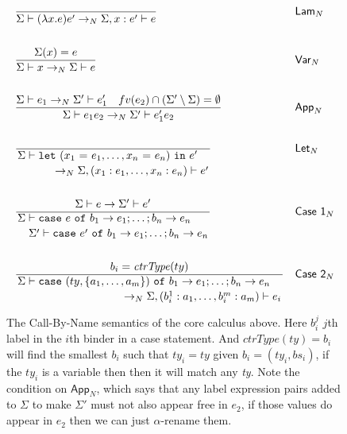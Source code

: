 \documentclass[float=false, crop=false]{standalone}
\numberwithin{subcase}{case}
\newcommand{\tcbn}{\rightarrow_N}
\begin{document}
\begin{figure}
\begin{align*}
  &\frac{}{\Sigma \vdash (\lambda x.e)e' \tcbn \Sigma,x:e' \vdash e } && \mathsf{Lam}_N \\ \\
  &\frac{\Sigma(x) = e}{\Sigma \vdash x \tcbn \Sigma \vdash e} && \mathsf{Var}_N\\ \\
  &\frac{\Sigma \vdash   e_1\tcbn \Sigma' \vdash e_1' \quad fv(e_2) \cap 
    (\Sigma' \setminus \Sigma) = \emptyset
  }{\Sigma \vdash e_1 e_2 \tcbn 
    \Sigma' \vdash e_1' e_2} && \mathsf{App}_N  \\ \\
  &\dfrac{}{\splitdfrac{\Sigma \vdash 
\mathtt{let}\ (x_1\ \mathtt{=}\ e_1,\dotsc, x_n\ \mathtt{=}\ e_n)\ \mathtt{in}\ e'}
    {\tcbn \Sigma,(x_1:e_1,\dotsc,x_n:e_n) \vdash e'}} && \mathsf{Let}_N  \\ \\
  &\dfrac{\Sigma \vdash e \rightarrow \Sigma' \vdash e'}{\splitdfrac{\Sigma \vdash 
  \mathtt{case}\ e\ \mathtt{of}\ b_1 \rightarrow e_1; \dots; b_n \rightarrow e_n}
  {\Sigma' \vdash\mathtt{case}\ e'\ \mathtt{of}\ b_1 \rightarrow e_1; \dots; b_n \rightarrow e_n}} 
      && \mathsf{Case\ 1}_N \\\\
  &\dfrac{b_i = \mathit{ctrType}(ty)}{\splitdfrac{\Sigma \vdash 
  \mathtt{case}\ (ty,\{a_1,\dotsc,a_m\}) \ \mathtt{of}\ b_1 \rightarrow e_1; \dots; b_n \rightarrow e_n}
  {\tcbn \Sigma,(b_i^1:a_1,\dotsc,b_i^m:a_m) \vdash e_i}} && \mathsf{Case\ 2}_N 
\end{align*}
\caption[The definition of the call-by-name semantics used by the core calculus]{The Call-By-Name semantics of the core calculus above.
  Here $b_i^j$ $j$th label in the $i$th binder in a case statement. And $\textit{ctrType}(ty) = b_i$ will
  find the smallest $b_i$ such that $ty_i = ty$ given $b_i = (ty_i,bs_i)$, 
  if the $\mathit{ty_i}$ is a variable then then it will match any \textit{ty}.
   Note the condition on $\mathsf{App}_N$, which says that any label 
 expression pairs added to $\Sigma$ to make $\Sigma'$ must not
 also appear free in $e_2$, if those values do appear in $e_2$ then we can
 just $\alpha$-rename them.}
\label{t:cbn}
\end{figure}
\end{document}
